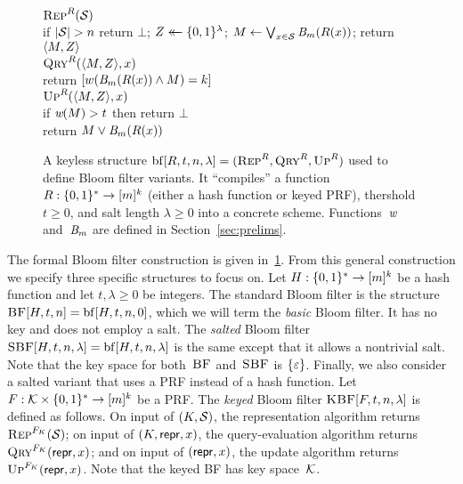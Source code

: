 
%
\begin{figure}
  {
    \underline{$\textnormal{\textsc{Rep}}^R(\mathcal{S})$}\\[2pt]
      if $|\mathcal{S}| > n$ return $\bot$;
      $Z \mathrel{\leftarrow\mkern-14mu\leftarrow} \{0,1\}^\lambda$;
      $M \gets \bigvee_{x \in \mathcal{S}} \textit{B}_m(R(x))$;
      return $\langle M, Z \rangle$
    \\[6pt]
    \underline{$\textnormal{\textsc{Qry}}^R(\langle M, Z \rangle,x)$}\\[2pt]
      return $[w(\textit{B}_m(R(x)) \wedge M) = k]$
    \\[6pt]
    \underline{$\textnormal{\textsc{Up}}^R(\langle M, Z \rangle,x)$}\\[2pt]
      if $\textit{w}(M) > t$ then return $\bot$\\
      return $M \vee \textit{B}_m(R(x))$
  }
  \caption{A keyless structure $\mathrm{bf}[R,t,n,\lambda] = (\textnormal{\textsc{Rep}}^R,\textnormal{\textsc{Qry}}^R,\textnormal{\textsc{Up}}^R)$
  used to define Bloom filter variants. It ``compiles'' a function $R: \{0,1\}^*
  \to [m]^k$ (either a hash function or keyed PRF), thershold $t\geq0$, and salt
  length $\lambda\geq0$ into a concrete scheme. Functions~$\textit{w}$ and~$\textit{B}_m$
  are defined in Section~\ref{sec:prelims}.
  }
  \label{fig:bf-def}
\end{figure}

The formal Bloom filter construction is given in~\ref{fig:bf-def}. From this
general construction we specify three specific structures to focus on.
%
Let $H:\{0,1\}^*\to[m]^k$ be a hash function and let $t, \lambda\geq0$ be
integers.
%
The standard Bloom filter is the structure $\textnormal{\textsc{BF}}[H,t,n] = \mathrm{bf}[H,t,n,0]$, which we will
term the \emph{basic} Bloom filter. It has no key and does not employ a salt.
%
The \emph{salted} Bloom filter $\textnormal{\textsc{SBF}}[H,t,n,\lambda] = \mathrm{bf}[H,t,n,\lambda]$ is the same except that
it allows a nontrivial salt.
%
Note that the key space for both~$\textnormal{\textsc{BF}}$ and~$\textnormal{\textsc{SBF}}$ is $\{\varepsilon\}$.
%
Finally, we also consider a salted variant that uses a PRF instead of a hash
function. Let $F:\mathcal{K}\times\{0,1\}^*\to[m]^k$ be a PRF. The \emph{keyed} Bloom
filter $\textnormal{\textsc{KBF}}[F,t,n,\lambda]$ is defined as follows. On input of $(K,\mathcal{S})$, the
representation algorithm returns $\textnormal{\textsc{Rep}}^{F_K}(\mathcal{S})$; on input of
$(K, \mathsf{repr}, x)$, the query-evaluation algorithm returns
$\textnormal{\textsc{Qry}}^{F_K}(\mathsf{repr}, x)$; and on input of $(\mathsf{repr}, x)$, the update algorithm
returns $\textnormal{\textsc{Up}}^{F_K}(\mathsf{repr}, x)$.
%
Note that the keyed BF has key space~$\mathcal{K}$.

